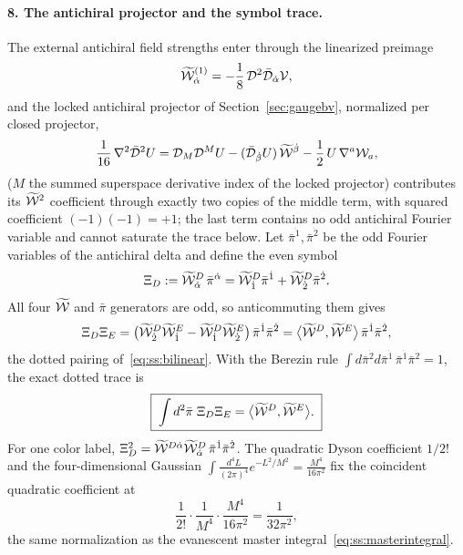 \paragraph{8. The antichiral projector and the symbol trace.}
The external antichiral field strengths enter through the linearized preimage
\begin{equation}\label{eq:ss:bc:preimage}
\widetilde{\mathcal{W}}_{\dot\alpha}^{(1)}=-\frac18\,\mathcal{D}^{2}\bar{\mathcal{D}}_{\dot\alpha}\mathcal{V} ,
\end{equation}
and the locked antichiral projector of Section~\ref{sec:gaugebv}, normalized
per closed projector,
\begin{equation}\label{eq:ss:bc:projector}
\frac{1}{16}\,\nabla^{2}\bar{\mathcal{D}}^{2}U
=\mathcal{D}_{M}\mathcal{D}^{M}U
-(\bar{\mathcal{D}}_{\dot\beta}U)\,\widetilde{\mathcal{W}}^{\dot\beta}
-\frac12\,U\,\nabla^{a}\mathcal{W}_{a} ,
\end{equation}
($M$ the summed superspace derivative index of the locked projector)
contributes its $\widetilde{\mathcal{W}}^{2}$ coefficient through exactly two copies of the
middle term, with squared coefficient $(-1)(-1)=+1$; the last term contains no
odd antichiral Fourier variable and cannot saturate the trace below. Let
$\bar\pi^{\dot1},\bar\pi^{\dot2}$ be the odd Fourier variables of the
antichiral delta and define the even symbol
\begin{equation}\label{eq:ss:bc:xi}
\Xi_{D}:=\widetilde{\mathcal{W}}_{\dot\alpha}^{D}\,\bar\pi^{\dot\alpha}
=\widetilde{\mathcal{W}}_{\dot1}^{D}\bar\pi^{\dot1}+\widetilde{\mathcal{W}}_{\dot2}^{D}\bar\pi^{\dot2} .
\end{equation}
All four $\widetilde{\mathcal{W}}$ and $\bar\pi$ generators are odd, so anticommuting them gives
\begin{equation}\label{eq:ss:bc:xixi}
\Xi_{D}\Xi_{E}
=\big(
\widetilde{\mathcal{W}}_{\dot2}^{D}\widetilde{\mathcal{W}}_{\dot1}^{E}
-\widetilde{\mathcal{W}}_{\dot1}^{D}\widetilde{\mathcal{W}}_{\dot2}^{E}
\big)\,\bar\pi^{\dot1}\bar\pi^{\dot2}
=\big\langle\widetilde{\mathcal{W}}^{D},\widetilde{\mathcal{W}}^{E}\big\rangle\,\bar\pi^{\dot1}\bar\pi^{\dot2} ,
\end{equation}
the dotted pairing of~\eqref{eq:ss:bilinear}. With the Berezin rule
$\int d\bar\pi^{\dot2}d\bar\pi^{\dot1}\,\bar\pi^{\dot1}\bar\pi^{\dot2}=1$, the
exact dotted trace is
\begin{equation}\label{eq:ss:bc:trace}
\boxed{\;\int d^{2}\bar\pi\;\Xi_{D}\Xi_{E}
=\big\langle\widetilde{\mathcal{W}}^{D},\widetilde{\mathcal{W}}^{E}\big\rangle .\;}
\end{equation}
For one color label,
$\Xi_{D}^{2}=\widetilde{\mathcal{W}}^{D\dot\alpha}\widetilde{\mathcal{W}}_{\dot\alpha}^{D}\,
\bar\pi^{\dot1}\bar\pi^{\dot2}$. The quadratic Dyson coefficient $1/2!$ and
the four-dimensional Gaussian
$\int\frac{d^{4}L}{(2\pi)^{4}}e^{-L^{2}/M^{2}}=\frac{M^{4}}{16\pi^{2}}$ fix
the coincident quadratic coefficient at
\begin{equation}\label{eq:ss:bc:gauss}
\frac{1}{2!}\cdot\frac{1}{M^{4}}\cdot\frac{M^{4}}{16\pi^{2}}
=\frac{1}{32\pi^{2}} ,
\end{equation}
the same normalization as the evanescent master
integral~\eqref{eq:ss:masterintegral}.


